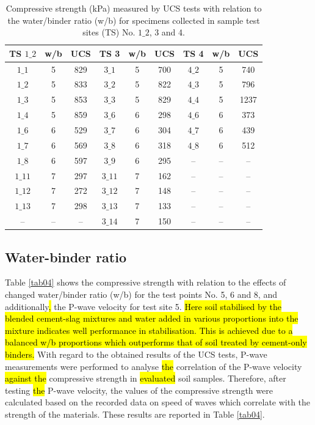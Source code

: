 \documentclass[sustainability,article,submit,pdftex,moreauthors]{Definitions/mdpi}
\begin{document}
\begin{table}[H] 
\caption{Compressive strength (kPa) measured by UCS tests with relation to the water/binder ratio (w/b) for specimens collected in sample test sites (TS) No. $1\_2$, 3 and 4.\label{tab03}}
\begin{tabularx}{\textwidth}{CCC||CCC||CCC }
\toprule
\textbf{TS $1\_2$} & \textbf{w/b} & \textbf{UCS} & \textbf{TS 3} & \textbf{w/b} & \textbf{UCS} & \textbf{TS 4} & \textbf{w/b} & \textbf{UCS}\\
\midrule
$1\_1$ & 5 & 829 & $3\_1$ & 5 & 700 & $4\_2$ & 5 & 740 \\
$1\_2$ & 5 & 833 & $3\_2$ & 5 & 822 & $4\_3$ & 5 & 796 \\
$1\_3$ & 5 & 853 & $3\_3$ & 5 & 829 & $4\_4$ & 5 & 1237 \\
$1\_4$ & 5 & 859 & $3\_6$ & 6 & 298 & $4\_6$ & 6 & 373 \\
$1\_6$ & 6 & 529 & $3\_7$ & 6 & 304 & $4\_7$ & 6 & 439 \\
$1\_7$ & 6 & 569 & $3\_8$ & 6 & 318 & $4\_8$ & 6 & 512 \\
$1\_8$ & 6 & 597 & $3\_9$ & 6 & 295 & -- & -- & -- \\
$1\_11$ & 7 & 297 & $3\_11$ & 7 & 162 & -- & -- & -- \\
$1\_12$ & 7 & 272 & $3\_12$ & 7 & 148 & -- & -- & -- \\
$1\_13$ & 7 & 298 & $3\_13$ & 7 & 133 & -- & -- & -- \\
-- & -- & -- & $3\_14$ & 7 & 150 & -- & -- & -- \\
\bottomrule
\end{tabularx}
\end{table}
 
\subsection{Water-binder ratio}
Table \ref{tab04} shows the compressive strength with relation to the effects of changed water/binder ratio (w/b) for the test points No. 5, 6 and 8, and additionally\hl{, }the P-wave velocity for test site 5. \hl{Here soil stabilised by the blended cement-slag mixtures and water added in various proportions into the mixture indicates well performance in stabilisation. This is achieved due to a balanced w/b proportions which outperforms that of soil treated by cement-only binders. }With regard to the obtained results of the UCS tests, P-wave measurements were performed to analyse \hl{the }correlation of the P-wave velocity \hl{against the} compressive strength in \hl{evaluated }soil samples. Therefore, after testing \hl{the }P-wave velocity, the values of the compressive strength were calculated based on the recorded data on speed of waves which correlate with the strength of the materials. These results are reported in Table \ref{tab04}. 
\end{document}
